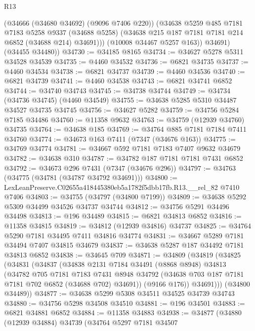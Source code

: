 \begin{lexlean}{R13}
\begin{coremodule}
            (@34666 (@34680 @34692) (@9096 @7406 @220))
            (@34638
              @5259
              @485
              @7181
              @7183
              @5258
              @9337
              (@34688 @5258)
              (@34638 @215 @187 @7181 @7181 @214 @6852 (@34688 @214) @34691)))
          (@10008 @34467 @5257 @163))
        @34691)
      (@34455 @34480))
@34730 := @34185 @8165
@34734 := @34627 @5278 @5311 @34528 @34539
@34735 := @4460 @34532
@34736 := @6821 @34735
@34737 := @4460 @34534
@34738 := @6821 @34737
@34739 := @4460 @34536
@34740 := @6821 @34739
@34741 := @4460 @34538
@34743 := @6821 @34741 @6852
@34744 := @34740 @34743
@34745 := @34738 @34744
@34749 := @34734 (@34736 @34745) (@4460 @34549)
@34755 := @34638 @5285 @5310 @34487 @34527 @34735 @34745
@34756 := @34627 @5282
@34759 := @34756 @5284 @7185 @34486
@34760 := @11358 @9632
@34763 := @34759 (@12939 @34760) @34735
@34764 := @34638 @185
@34769 := @34764 @885 @7181 @7184 @7411 @34760
@34774 := @34673 @163 @7411 (@7347 (@34676 @163))
@34775 := @34769 @34774
@34781 := @34667 @592 @7181 @7183 @7407 @9632 @34679
@34782 := @34638 @310
@34787 := @34782 @187 @7181 @7181 @7431 @6852
@34792 := @34673 @296 @7431 (@7347 (@34676 @296))
@34797 := @34763 (@34775 (@34781 (@34787 @34792 @34691)))
@34800 := LexLeanPreserve.C02655a418445380eb5a1782f5dbb17fb.R13.__rel_82 @7410 @7406
@34803 := @34755 (@34797 (@34800 @7199))
@34809 := @34638 @5292 @5309 @34499 @34526 @34737 @34744
@34812 := @34756 @5291 @34496 @34498
@34813 := @196 @34489
@34815 := @6821 @34813 @6852
@34816 := @11358 @34815
@34819 := @34812 (@12939 @34816) @34737
@34825 := @34764 @5290 @7181 @34495 @7411 @34816 @34774
@34831 := @34667 @5289 @7181 @34494 @7407 @34815 @34679
@34837 := @34638 @5287 @187 @34492 @7181 @34813 @6852
@34838 := @34645 @709
@34871 := @34809
    (@34819
      (@34825
        (@34831
          (@34837
            (@34838
              @2131
              @7184
              @34491
              (@8868 @8948)
              @34813
              (@34782
                @705
                @7181
                @7183
                @7431
                @8948
                @34792
                (@34638 @703 @187 @7181 @7181 @702 @6852 (@34688 @702) @34691))
              (@9166 @176))
            @34691)))
      (@34800 @34489))
@34877 := @34638 @5299 @5308 @34511 @34525 @34739 @34743
@34880 := @34756 @5298 @34508 @34510
@34881 := @196 @34501
@34883 := @6821 @34881 @6852
@34884 := @11358 @34883
@34938 := @34877
    (@34880
      (@12939 @34884)
      @34739
      (@34764
        @5297
        @7181
        @34507

\end{coremodule}
\end{lexlean}

